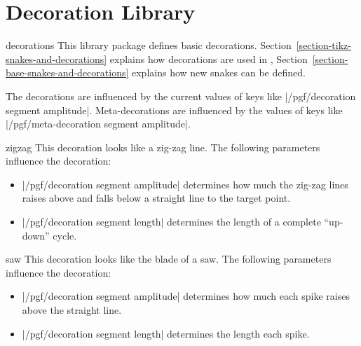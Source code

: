 %
%
%

\section{Decoration Library}
\label{section-library-decorations}

\begin{pgflibrary}{decorations}
  This library package defines basic decorations.
  Section~\ref{section-tikz-snakes-and-decorations} explains how
  decorations are used in \tikzname,
  Section~\ref{section-base-snakes-and-decorations}   explains how new
  snakes can be defined. 

  The decorations are influenced by the current values of keys like
  |/pgf/decoration segment amplitude|. Meta-decorations are influenced
  by the values of keys like |/pgf/meta-decoration segment amplitude|.
\end{pgflibrary}

\begin{decoration}{zigzag}
	This decoration looks like a zig-zag line. The following parameters
  influence the decoration:
  \begin{itemize}
  \item |/pgf/decoration segment amplitude|
    determines how much the zig-zag lines raises above and falls below
    a straight line to the target point.
  \item |/pgf/decoration segment length|
    determines the length of a complete ``up-down'' cycle.
  \end{itemize}
\begin{codeexample}[]
\end{codeexample}
\end{decoration}

\begin{decoration}{saw}
	This decoration looks like the blade of a saw. The following parameters
  influence the decoration:
  \begin{itemize}
  \item |/pgf/decoration segment amplitude|
    determines how much each spike raises above the straight line.
  \item |/pgf/decoration segment length|
    determines the length each spike.
  \end{itemize}
\begin{codeexample}[]
\end{codeexample}
\end{decoration}


